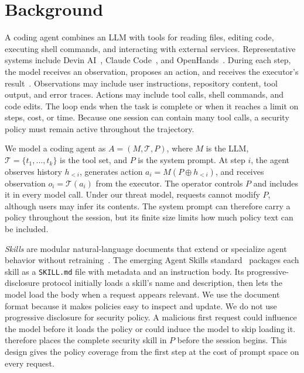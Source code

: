 \section{Background}
\label{sec:background}

A coding agent combines an LLM with tools for reading files, editing code, executing shell commands, and interacting with external services. Representative systems include Devin AI~\cite{devin2024}, Claude Code~\cite{claudecode2025}, and OpenHands~\cite{wang2025openhands}. During each step, the model receives an observation, proposes an action, and receives the executor's result~\cite{yao2022react}. Observations may include user instructions, repository content, tool output, and error traces. Actions may include tool calls, shell commands, and code edits. The loop ends when the task is complete or when it reaches a limit on steps, cost, or time. Because one session can contain many tool calls, a security policy must remain active throughout the trajectory.

We model a coding agent as $A = (M, \mathcal{T}, P)$, where $M$ is the LLM, $\mathcal{T} = \{t_1, \ldots, t_k\}$ is the tool set, and $P$ is the system prompt. At step $i$, the agent observes history $h_{<i}$, generates action $a_i = M(P \oplus h_{<i})$, and receives observation $o_i = \mathcal{T}(a_i)$ from the executor. The operator controls $P$ and includes it in every model call. Under our threat model, requests cannot modify $P$, although users may infer its contents. The system prompt can therefore carry a policy throughout the session, but its finite size limits how much policy text can be included.

\emph{Skills} are modular natural-language documents that extend or specialize agent behavior without retraining~\cite{anthropic2025skills}. The emerging Agent Skills standard~\cite{agentskills2025} packages each skill as a \texttt{SKILL.md} file with metadata and an instruction body. Its progressive-disclosure protocol initially loads a skill's name and description, then lets the model load the body when a request appears relevant. We use the document format because it makes policies easy to inspect and update. We do not use progressive disclosure for security policy. A malicious first request could influence the model before it loads the policy or could induce the model to skip loading it. \sysname therefore places the complete security skill in $P$ before the session begins. This design gives the policy coverage from the first step at the cost of prompt space on every request.
